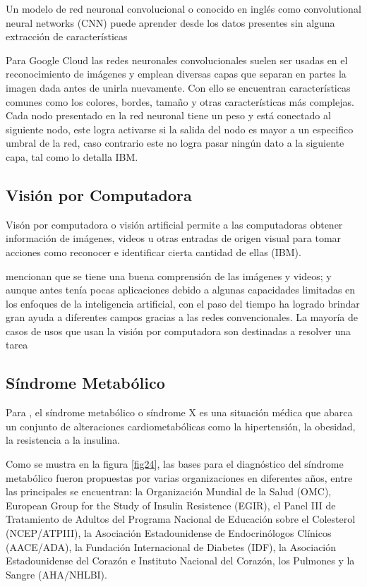 Un modelo de red neuronal convolucional o conocido en inglés como convolutional neural networks (CNN) puede aprender desde los datos presentes sin alguna extracción de características \parencite{xin2018machine}

Para Google Cloud las redes neuronales convolucionales suelen ser usadas en el reconocimiento de imágenes y emplean diversas capas que separan en partes la imagen dada antes de unirla nuevamente. Con ello se encuentran características comunes como los colores, bordes, tamaño y otras características más complejas. Cada nodo presentado en la red neuronal tiene un peso y está conectado al siguiente nodo, este logra activarse si la salida del nodo es mayor a un especifico umbral de la red, caso contrario este no logra pasar ningún dato a la siguiente capa, tal como lo detalla IBM.



\subsection{Visión por Computadora}

Visón por computadora o visión artificial permite a las computadoras obtener información de imágenes, videos u otras entradas de origen visual para tomar acciones como reconocer e identificar cierta cantidad de ellas (IBM).

\parencite{bohr2021inteligencia} mencionan que se tiene una buena comprensión de las imágenes y videos; y aunque antes tenía pocas aplicaciones debido a algunas capacidades limitadas en los enfoques de la inteligencia artificial, con el paso del tiempo ha logrado brindar gran ayuda a diferentes campos gracias a las redes convencionales. La mayoría de casos de usos que usan la visión por computadora son destinadas a resolver una tarea 


\subsection{Síndrome Metabólico}

Para \parencite{ramos2022sindrome}, el síndrome metabólico o síndrome X es una situación médica que abarca un conjunto de alteraciones cardiometabólicas como la hipertensión, la obesidad, la resistencia a la insulina.

Como se mustra en la figura \ref{fig24}, las bases para el diagnóstico del síndrome metabólico fueron propuestas por varias organizaciones en diferentes años, entre las principales se encuentran: la Organización Mundial de la Salud (OMC), European Group for the Study of Insulin Resistence (EGIR), el Panel III de Tratamiento de Adultos del Programa Nacional de Educación sobre el Colesterol (NCEP/ATPIII), la Asociación Estadounidense de Endocrinólogos Clínicos (AACE/ADA), la Fundación Internacional de Diabetes (IDF), la Asociación Estadounidense del Corazón e Instituto Nacional del Corazón, los Pulmones y la Sangre (AHA/NHLBI).

